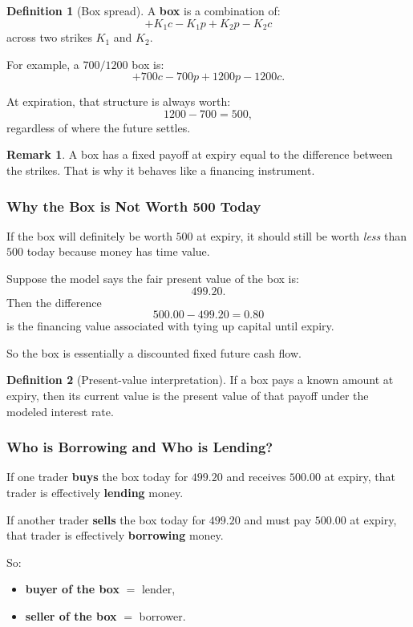\documentclass[11pt]{article}
\theoremstyle{definition}
\newtheorem{definition}{Definition}[section]
\newtheorem{remark}{Remark}[section]
\begin{document}
\begin{definition}[Box spread]
A \textbf{box} is a combination of:
\[
+K_1c - K_1p + K_2p - K_2c
\]
across two strikes \(K_1\) and \(K_2\).
\end{definition}

For example, a \(700/1200\) box is:
\[
+700c -700p +1200p -1200c.
\]

At expiration, that structure is always worth:
\[
1200 - 700 = 500,
\]
regardless of where the future settles.

\begin{remark}
A box has a fixed payoff at expiry equal to the difference between the strikes. That is why it behaves like a financing instrument.
\end{remark}

\subsubsection*{Why the Box is Not Worth 500 Today}

If the box will definitely be worth \(500\) at expiry, it should still be worth \emph{less} than \(500\) today because money has time value.

Suppose the model says the fair present value of the box is:
\[
499.20.
\]
Then the difference
\[
500.00 - 499.20 = 0.80
\]
is the financing value associated with tying up capital until expiry.

So the box is essentially a discounted fixed future cash flow.

\begin{definition}[Present-value interpretation]
If a box pays a known amount at expiry, then its current value is the present value of that payoff under the modeled interest rate.
\end{definition}

\subsubsection*{Who is Borrowing and Who is Lending?}

If one trader \textbf{buys} the box today for \(499.20\) and receives \(500.00\) at expiry, that trader is effectively \textbf{lending} money.

If another trader \textbf{sells} the box today for \(499.20\) and must pay \(500.00\) at expiry, that trader is effectively \textbf{borrowing} money.

So:

\begin{itemize}
    \item \textbf{buyer of the box} \(=\) lender,
    \item \textbf{seller of the box} \(=\) borrower.
\end{itemize}
\end{document}
